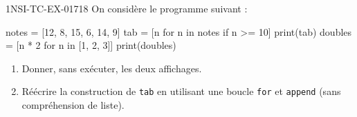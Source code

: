\begin{exercice}{1NSI-TC-EX-017}{1}{8}
On considère le programme suivant :
\begin{python}
notes = [12, 8, 15, 6, 14, 9]
tab = [n for n in notes if n >= 10]
print(tab)
doubles = [n * 2 for n in [1, 2, 3]]
print(doubles)
\end{python}
\begin{enumerate}
  \item Donner, sans exécuter, les deux affichages.
  \item Réécrire la construction de \lstinline{tab} en utilisant une boucle
        \lstinline{for} et \lstinline{append} (sans compréhension de liste).
\end{enumerate}
\end{exercice}
